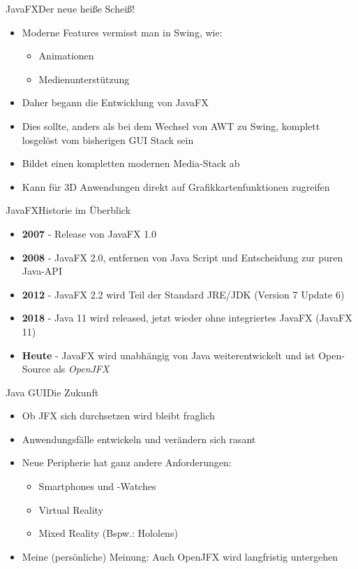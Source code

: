 \begin{frame}{JavaFX}{Der neue heiße Scheiß!}
	\begin{itemize}
		\item Moderne Features vermisst man in Swing, wie:
		\begin{itemize}
			\item Animationen
			\item Medienunterstützung
		\end{itemize}
		\item Daher begann die Entwicklung von JavaFX
		\item Dies sollte, anders als bei dem Wechsel von AWT zu Swing, komplett losgelöst vom bisherigen GUI Stack sein
		\item Bildet einen kompletten modernen Media-Stack ab
		\item Kann für 3D Anwendungen direkt auf Grafikkartenfunktionen zugreifen
	\end{itemize}
\end{frame}

\begin{frame}{JavaFX}{Historie im Überblick}
	\begin{itemize}
		\item \textbf{2007} - Release von JavaFX 1.0
		\item \textbf{2008} - JavaFX 2.0, entfernen von Java Script und Entscheidung zur puren Java-API
		\item \textbf{2012} - JavaFX 2.2 wird Teil der Standard JRE/JDK (Version 7 Update 6)
		\item \textbf{2018} - Java 11 wird released, jetzt wieder ohne integriertes JavaFX (JavaFX 11)
		\item \textbf{Heute} - JavaFX wird unabhängig von Java weiterentwickelt und ist Open-Source als \textit{OpenJFX}
	\end{itemize}
\end{frame}

\begin{frame}{Java GUI}{Die Zukunft}
	\begin{itemize}
		\item Ob JFX sich durchsetzen wird bleibt fraglich
		\item Anwendungsfälle entwickeln und verändern sich rasant
		\item Neue Peripherie hat ganz andere Anforderungen:
		\begin{itemize}
			\item Smartphones und -Watches
			\item Virtual Reality
			\item Mixed Reality (Bspw.: Hololens)
		\end{itemize}
		\item Meine (persönliche) Meinung: Auch OpenJFX wird langfristig untergehen
	\end{itemize}
\end{frame}